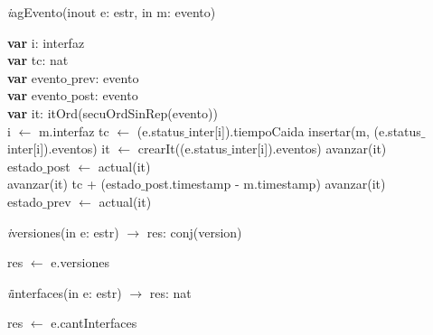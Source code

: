 \textit{i}agEvento(inout e: estr, in m: evento)\\
\begin{algorithm}[H]
\BlankLine
\textbf{var} i: interfaz\\
\textbf{var} tc: nat\\
\textbf{var} evento$\_$prev: evento\\
\textbf{var} evento$\_$post: evento\\
\textbf{var} it: itOrd(secuOrdSinRep(evento)) \\
\BlankLine
i $\leftarrow$ m.interfaz
\BlankLine
tc $\leftarrow$ (e.status$\_$inter[i]).tiempoCaida
\BlankLine
insertar(m, (e.status$\_$inter[i]).eventos)
\BlankLine
it $\leftarrow$ crearIt((e.status$\_$inter[i]).eventos)
\BlankLine
{}
	{avanzar(it)\\
	}{
		{estado$\_$post $\leftarrow$ actual(it)\\ avanzar(it)}
	\BlankLine
		{tc + (estado$\_$post.timestamp - m.timestamp)}{
		avanzar(it)\\ 
		estado$\_$prev $\leftarrow$ actual(it)\\ 
		\BlankLine 
		}}
		
\end{algorithm}

\vspace{11pt}

\textit{i}versiones(in e: estr) $\longrightarrow$ res: conj(version)\\
\begin{algorithm}[H]
\BlankLine
res $\leftarrow$ e.versiones
\end{algorithm}

\vspace{11pt}

\textit{i}interfaces(in e: estr) $\longrightarrow$ res: nat\\
\begin{algorithm}[H]
\BlankLine
res $\leftarrow$ e.cantInterfaces 
\end{algorithm}

\vspace{11pt}


